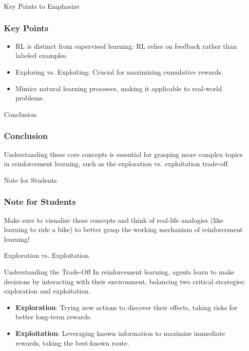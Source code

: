\documentclass[aspectratio=169]{beamer}
\begin{document}
\begin{frame}[fragile]{Key Points to Emphasize}
    \frametitle{Key Points}
    \begin{itemize}
        \item RL is distinct from supervised learning: RL relies on feedback rather than labeled examples.
        \item Exploring vs. Exploiting: Crucial for maximizing cumulative rewards.
        \item Mimics natural learning processes, making it applicable to real-world problems.
    \end{itemize}
\end{frame}

\begin{frame}[fragile]{Conclusion}
    \frametitle{Conclusion}
    Understanding these core concepts is essential for grasping more complex topics in reinforcement learning, such as the exploration vs. exploitation trade-off.
\end{frame}

\begin{frame}[fragile]{Note for Students}
    \frametitle{Note for Students}
    Make sure to visualize these concepts and think of real-life analogies (like learning to ride a bike) to better grasp the working mechanism of reinforcement learning!
\end{frame}

\begin{frame}[fragile]{Exploration vs. Exploitation}
    \begin{block}{Understanding the Trade-Off}
        In reinforcement learning, agents learn to make decisions by interacting with their environment, balancing two critical strategies: exploration and exploitation.
    \end{block}
    
    \begin{itemize}
        \item \textbf{Exploration}: Trying new actions to discover their effects, taking risks for better long-term rewards.
        \item \textbf{Exploitation}: Leveraging known information to maximize immediate rewards, taking the best-known route.
    \end{itemize}
\end{frame}
\end{document}
